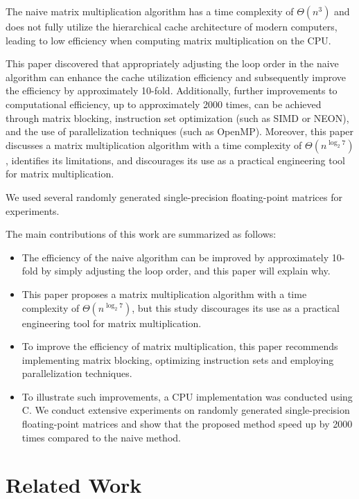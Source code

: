 \documentclass[conference]{IEEEtran}
\begin{document}
	The naive matrix multiplication algorithm has a time complexity of $\Theta(n^3)$ and does not fully utilize the hierarchical cache architecture of modern computers, leading to low efficiency when computing matrix multiplication on the CPU.
	
	This paper discovered that appropriately adjusting the loop order in the naive algorithm can enhance the cache utilization efficiency and subsequently improve the efficiency by approximately 10-fold. Additionally, further improvements to computational efficiency, up to approximately 2000 times, can be achieved through matrix blocking, instruction set optimization (such as SIMD or NEON), and the use of parallelization techniques (such as OpenMP). Moreover, this paper discusses a matrix multiplication algorithm with a time complexity of $\Theta(n^{\log_2 7})$, identifies its limitations, and discourages its use as a practical engineering tool for matrix multiplication.
	
	We used several randomly generated single-precision floating-point matrices for experiments.
	
	The main contributions of this work are summarized as follows:
	
	\begin{itemize}
		\item The efficiency of the naive algorithm can be improved by approximately 10-fold by simply adjusting the loop order, and this paper will explain why.
		\item This paper proposes a matrix multiplication algorithm with a time complexity of $\Theta(n^{\log_2 7})$, but this study discourages its use as a practical engineering tool for matrix multiplication.
		\item To improve the efficiency of matrix multiplication, this paper recommends implementing matrix blocking, optimizing instruction sets and employing parallelization techniques.
		\item  To illustrate such improvements, a CPU implementation was conducted using C. We conduct extensive experiments on randomly generated single-precision floating-point matrices and show that the proposed method speed up by 2000 times compared to the naive method.
	\end{itemize}

	\section{Related Work}
\end{document}
